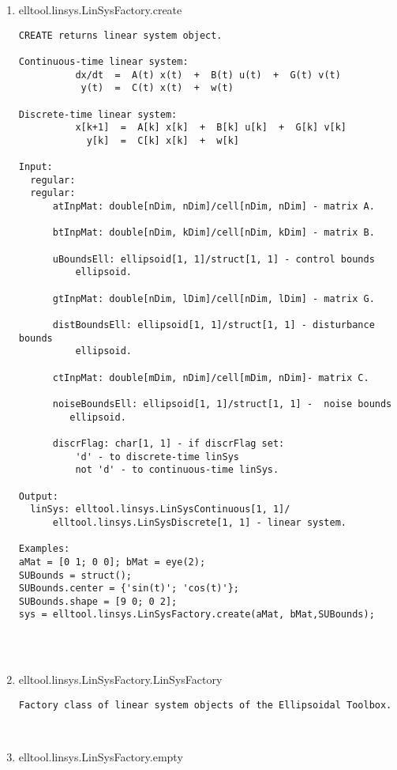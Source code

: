 \begin{enumerate}
\begin{lstlisting}
\end{lstlisting}
\fontfamily{\familydefault}
\selectfont
\item {elltool.linsys.LinSysFactory.create}
\selectfont
\begin{lstlisting}
CREATE returns linear system object.

Continuous-time linear system:
          dx/dt  =  A(t) x(t)  +  B(t) u(t)  +  G(t) v(t)
           y(t)  =  C(t) x(t)  +  w(t)

Discrete-time linear system:
          x[k+1]  =  A[k] x[k]  +  B[k] u[k]  +  G[k] v[k]
            y[k]  =  C[k] x[k]  +  w[k]

Input:
  regular:
  regular:
      atInpMat: double[nDim, nDim]/cell[nDim, nDim] - matrix A.

      btInpMat: double[nDim, kDim]/cell[nDim, kDim] - matrix B.

      uBoundsEll: ellipsoid[1, 1]/struct[1, 1] - control bounds
          ellipsoid.

      gtInpMat: double[nDim, lDim]/cell[nDim, lDim] - matrix G.

      distBoundsEll: ellipsoid[1, 1]/struct[1, 1] - disturbance bounds
          ellipsoid.

      ctInpMat: double[mDim, nDim]/cell[mDim, nDim]- matrix C.

      noiseBoundsEll: ellipsoid[1, 1]/struct[1, 1] -  noise bounds
         ellipsoid.

      discrFlag: char[1, 1] - if discrFlag set:
          'd' - to discrete-time linSys
          not 'd' - to continuous-time linSys.

Output:
  linSys: elltool.linsys.LinSysContinuous[1, 1]/
      elltool.linsys.LinSysDiscrete[1, 1] - linear system.

Examples:
aMat = [0 1; 0 0]; bMat = eye(2);
SUBounds = struct();
SUBounds.center = {'sin(t)'; 'cos(t)'};
SUBounds.shape = [9 0; 0 2];
sys = elltool.linsys.LinSysFactory.create(aMat, bMat,SUBounds);




\end{lstlisting}
\fontfamily{\familydefault}
\selectfont
\item {elltool.linsys.LinSysFactory.LinSysFactory}
\selectfont
\begin{lstlisting}
Factory class of linear system objects of the Ellipsoidal Toolbox.



\end{lstlisting}
\fontfamily{\familydefault}
\selectfont
\item {elltool.linsys.LinSysFactory.empty}
\selectfont
\begin{lstlisting}



\end{lstlisting}
\fontfamily{\familydefault}
\selectfont
\end{enumerate}
